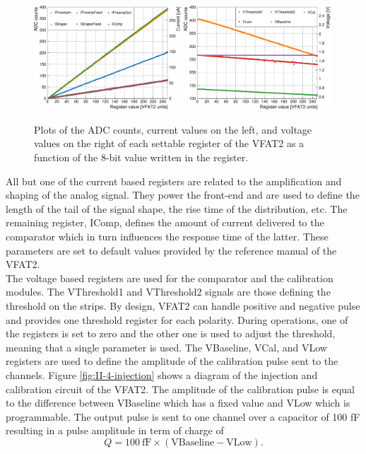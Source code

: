       \begin{figure}[h!]
        \centering
        \includegraphics[width=0.49\textwidth]{img/plots/cADC_Current-crop}
        \includegraphics[width=0.49\textwidth]{img/plots/cADC_Voltage-crop}
        \caption{Plots of the ADC counts, current values on the left, and voltage values on the right of each settable register of the VFAT2 as a function of the 8-bit value written in the register.}
        \label{fig:II-4-adc}
      \end{figure}

      All but one of the current based registers are related to the amplification and shaping of the analog signal. They power the front-end and are used to define the length of the tail of the signal shape, the rise time of the distribution, etc. The remaining register, IComp, defines the amount of current delivered to the comparator which in turn influences the response time of the latter. These parameters are set to default values provided by the reference manual of the VFAT2. \\

      The voltage based registers are used for the comparator and the calibration modules. The VThreshold1 and VThreshold2 signals are those defining the threshold on the strips. By design, VFAT2 can handle positive and negative pulse and provides one threshold register for each polarity. During operations, one of the registers is set to zero and the other one is used to adjust the threshold, meaning that a single parameter is used. The VBaseline, VCal, and VLow registers are used to define the amplitude of the calibration pulse sent to the channels. Figure \ref{fig:II-4-injection} shows a diagram of the injection and calibration circuit of the VFAT2. The amplitude of the calibration pulse is equal to the difference between VBaseline which has a fixed value and VLow which is programmable. The output pulse is sent to one channel over a capacitor of 100 fF resulting in a pulse amplitude in term of charge of
      \begin{equation}
        \label{eq:II-4-injection}
        Q = 100 \ \text{fF} \times \left(\text{VBaseline} - \text{VLow} \right) .
      \end{equation}

